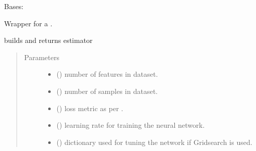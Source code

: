 \documentclass[letterpaper,10pt,english]{sphinxmanual}
\begin{document}

\begin{fulllineitems}
\label{\detokenize{estimators:mleap.estimators.nn_estimators.Deep_NN_Regressor}}
Bases: {\hyperref[\detokenize{estimators:mleap.estimators.mleap_estimator.MleapEstimator}]{}}

Wrapper for a .

\begin{fulllineitems}
\label{\detokenize{estimators:mleap.estimators.nn_estimators.Deep_NN_Regressor.build}}
builds and returns estimator
\begin{quote}\begin{description}
\item[{Parameters}] \leavevmode\begin{itemize}
\item {} 
 () \textendash{} number of features in dataset.

\item {} 
 () \textendash{} number of samples in dataset.

\item {} 
 () \textendash{} 
loss metric as per .


\item {} 
 () \textendash{} learning rate for training the neural network.

\item {} 
 () \textendash{} dictionary used for tuning the network if Gridsearch is used.


\end{itemize}
\end{description}
\end{quote}
\end{fulllineitems}
\end{fulllineitems}
\end{document}
